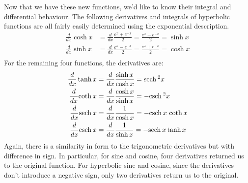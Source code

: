 \documentclass[fleqn]{report}
\begin{document}
Now that we have these new functions, we'd like to know their
integral and differential behaviour. The following derivatives
and integrals of hyperbolic functions are all fairly easily
determined using the exponential description. 
\begin{align*}
\frac{d}{dx} \cosh x & = \frac{d}{dx} \frac{e^x + e^{-x}}{2} =
\frac{e^x - e^{-x}}{2} = \sinh x \\
\frac{d}{dx} \sinh x & = \frac{d}{dx} \frac{e^x - e^{-x}}{2} =
\frac{e^x + e^{-x}}{2} = \cosh x \\
\end{align*}
For the remaining four functions, the derivatives are:
\begin{align*}
\frac{d}{dx} \tanh x & = \frac{d}{dx} \frac{\sinh x}{\cosh x} =
\mathrm{sech}\hspace{0.07cm}^2 x \\
\frac{d}{dx} \mathrm{coth}\hspace{0.07cm} x & = \frac{d}{dx} \frac{\cosh x}{\sinh x} =
-\mathrm{csch}\hspace{0.07cm}^2 x \\
\frac{d}{dx} \mathrm{sech}\hspace{0.07cm} x & = \frac{d}{dx} \frac{1}{\cosh x} =
- \mathrm{csch}\hspace{0.07cm} x \ \mathrm{coth}\hspace{0.07cm} x \\
\frac{d}{dx} \mathrm{csch}\hspace{0.07cm} x & = \frac{d}{dx} \frac{1}{\sinh x} =
- \mathrm{sech}\hspace{0.07cm} x \tanh x 
\end{align*}
Again, there is a similarity in form to the trigonometric
derivatives but with difference in sign. In particular, for
sine and cosine, four derivatives returned us to the original
function. For hyperbolic sine and cosine, since the
derivatives don't introduce a negative sign, only two
derivatives return us to the original.
\end{document}
